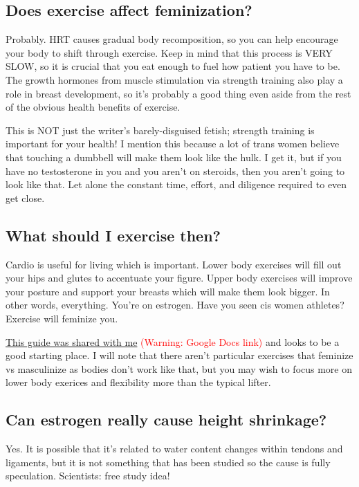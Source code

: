 \documentclass{article}
\begin{document}
\subsection{Does exercise affect feminization?}

Probably. HRT causes gradual body recomposition, so you can help encourage your body to shift through exercise. Keep in mind that this process is VERY SLOW, so it is crucial that you eat enough to fuel how patient you have to be. The growth hormones from muscle stimulation via strength training also play a role in breast development, so it’s probably a good thing even aside from the rest of the obvious health benefits of exercise.

This is NOT just the writer’s barely-disguised fetish; strength training is important for your health! I mention this because a lot of trans women believe that touching a dumbbell will make them look like the hulk. I get it, but if you have no testosterone in you and you aren’t on steroids, then you aren’t going to look like that. Let alone the constant time, effort, and diligence required to even get close.

\subsection{What should I exercise then?}\label{11-16}

Cardio is useful for living which is important. Lower body exercises will fill out your hips and glutes to accentuate your figure. Upper body exercises will improve your posture and support your breasts which will make them look bigger. In other words, everything. You’re on estrogen. Have you seen cis women athletes? Exercise will feminize you.

\href{https://docs.google.com/document/d/1-NyE5EY5TTaRRMhk7HlTbKJ7HifjEsA4jlDO1qKQVl0/edit?tab=t.0}{This guide was shared with me} \textcolor{red}{(Warning: Google Docs link)} and looks to be a good starting place. I will note that there aren't particular exercises that feminize vs masculinize as bodies don't work like that, but you may wish to focus more on lower body exerices and flexibility more than the typical lifter.

\subsection{Can estrogen really cause height shrinkage?}

Yes. It is possible that it’s related to water content changes within tendons and ligaments, but it is not something that has been studied so the cause is fully speculation. Scientists: free study idea!
\end{document}
